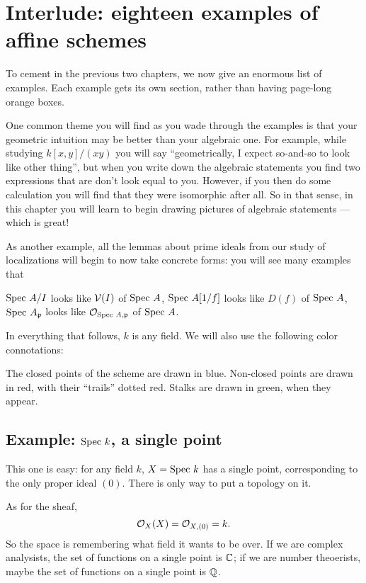 \chapter{Interlude: eighteen examples of affine schemes}
\label{ch:spec_examples}
To cement in the previous two chapters,
we now give an enormous list of examples.
Each example gets its own section,
rather than having page-long orange boxes.

One common theme you will find as you wade through
the examples is that your geometric intuition may
be better than your algebraic one.
For example, while studying $k[x,y] / (xy)$ you will say
``geometrically, I expect so-and-so to look like other thing'',
but when you write down the algebraic statements
you find two expressions that are don't look equal to you.
However, if you then do some calculation you will
find that they were isomorphic after all.
So in that sense, in this chapter you will learn to begin drawing
pictures of algebraic statements --- which is great!

As another example, all the lemmas about
prime ideals from our study of localizations
will begin to now take concrete forms:
you will see many examples that
\begin{itemize}
	\ii $\text{Spec } A/I$ looks like $\mathcal V(I)$ of $\text{Spec } A$,
	\ii $\text{Spec } A[1/f]$ looks like $D(f)$ of $\text{Spec } A$,
	\ii $\text{Spec } A_\mathfrak p$ looks like $\mathcal O_{\text{Spec } A, \mathfrak p}$ of $\text{Spec } A$.
\end{itemize}

In everything that follows, $k$ is any field.
We will also use the following color connotations:
\begin{itemize}
	\ii The closed points of the scheme are drawn in blue.
	\ii Non-closed points are drawn in red,
	with their ``trails'' dotted red.
	\ii Stalks are drawn in green, when they appear.
\end{itemize}


\section{Example: $\text{Spec } k$, a single point}
This one is easy: for any field $k$,
$X = \text{Spec } k$ has a single point,
corresponding to the only proper ideal $(0)$.
There is only way to put a topology on it.

As for the sheaf,
\[ \mathcal O_X(X) = \mathcal O_{X,(0)} = k. \]
So the space is remembering what field it wants to be over.
If we are complex analysists,
the set of functions on a single point is $\mathbb C$;
if we are number theoerists,
maybe the set of functions on a single point is $\mathbb Q$.

